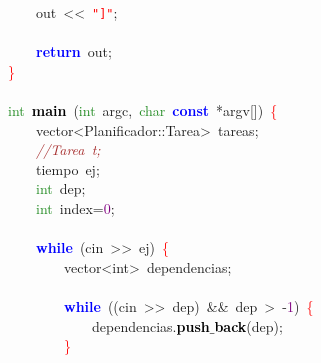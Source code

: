 \mbox{}\ \ \ \ out\ \textcolor{BrickRed}{\textless{}\textless{}}\ \texttt{\textcolor{Red}{"{}]"{}}}\textcolor{BrickRed}{;} \\
\mbox{} \\
\mbox{}\ \ \ \ \textbf{\textcolor{Blue}{return}}\ out\textcolor{BrickRed}{;} \\
\mbox{}\textcolor{Red}{\}} \\
\mbox{} \\
\mbox{}\textcolor{ForestGreen}{int}\ \textbf{\textcolor{Black}{main}}\ \textcolor{BrickRed}{(}\textcolor{ForestGreen}{int}\ argc\textcolor{BrickRed}{,}\ \textcolor{ForestGreen}{char}\ \textbf{\textcolor{Blue}{const}}\ \textcolor{BrickRed}{*}argv\textcolor{BrickRed}{[])}\ \textcolor{Red}{\{} \\
\mbox{}\ \ \ \ \textcolor{TealBlue}{vector\textless{}Planificador::Tarea\textgreater{}}\ tareas\textcolor{BrickRed}{;} \\
\mbox{}\ \ \ \ \textit{\textcolor{Brown}{//Tarea\ t;}} \\
\mbox{}\ \ \ \ \textcolor{TealBlue}{tiempo}\ ej\textcolor{BrickRed}{;} \\
\mbox{}\ \ \ \ \textcolor{ForestGreen}{int}\ dep\textcolor{BrickRed}{;} \\
\mbox{}\ \ \ \ \textcolor{ForestGreen}{int}\ index\textcolor{BrickRed}{=}\textcolor{Purple}{0}\textcolor{BrickRed}{;} \\
\mbox{} \\
\mbox{}\ \ \ \ \textbf{\textcolor{Blue}{while}}\ \textcolor{BrickRed}{(}cin\ \textcolor{BrickRed}{\textgreater{}\textgreater{}}\ ej\textcolor{BrickRed}{)}\ \textcolor{Red}{\{} \\
\mbox{}\ \ \ \ \ \ \ \ \textcolor{TealBlue}{vector\textless{}int\textgreater{}}\ dependencias\textcolor{BrickRed}{;} \\
\mbox{} \\
\mbox{}\ \ \ \ \ \ \ \ \textbf{\textcolor{Blue}{while}}\ \textcolor{BrickRed}{((}cin\ \textcolor{BrickRed}{\textgreater{}\textgreater{}}\ dep\textcolor{BrickRed}{)}\ \textcolor{BrickRed}{\&\&}\ dep\ \textcolor{BrickRed}{\textgreater{}}\ \textcolor{BrickRed}{-}\textcolor{Purple}{1}\textcolor{BrickRed}{)}\ \textcolor{Red}{\{} \\
\mbox{}\ \ \ \ \ \ \ \ \ \ \ \ dependencias\textcolor{BrickRed}{.}\textbf{\textcolor{Black}{push$\_$back}}\textcolor{BrickRed}{(}dep\textcolor{BrickRed}{);} \\
\mbox{}\ \ \ \ \ \ \ \ \textcolor{Red}{\}} \\
\mbox{} \\
